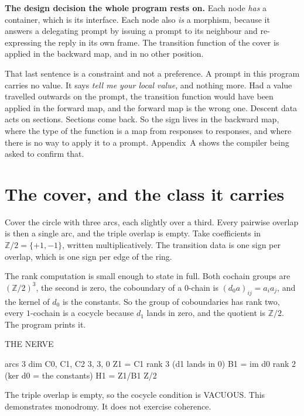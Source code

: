 \documentclass[11pt,a4paper]{article}
\begin{document}
\begin{sectionbox}
\textbf{The design decision the whole program rests on.} Each node \emph{has} a
container, which is its interface. Each node also \emph{is} a morphism, because it
answers a delegating prompt by issuing a prompt to its neighbour and re-expressing
the reply in its own frame. The transition function of the cover is applied in the
backward map, and in no other position.
\end{sectionbox}

That last sentence is a constraint and not a preference. A prompt in this program
carries no value. It says \emph{tell me your local value}, and nothing more. Had a
value travelled outwards on the prompt, the transition function would have been
applied in the forward map, and the forward map is the wrong one. Descent data acts
on sections. Sections come back. So the sign lives in the backward map, where the
type of the function is a map from responses to responses, and where there is no way
to apply it to a prompt. Appendix~A shows the compiler being asked to confirm that.

\section{The cover, and the class it carries}

Cover the circle with three arcs, each slightly over a third. Every pairwise overlap
is then a single arc, and the triple overlap is empty. Take coefficients in
$\mathbb{Z}/2 = \{+1,-1\}$, written multiplicatively. The transition data is one sign
per overlap, which is one sign per edge of the ring.

The rank computation is small enough to state in full. Both cochain groups are
$(\mathbb{Z}/2)^3$, the second is zero, the coboundary of a $0$-chain is
$(d_0 a)_{ij} = a_i a_j$, and the kernel of $d_0$ is the constants. So the group of
coboundaries has rank two, every $1$-cochain is a cocycle because $d_1$ lands in
zero, and the quotient is $\mathbb{Z}/2$. The program prints it.

\begin{term}
  THE NERVE

    arcs                    3
    dim C0, C1, C2          3, 3, 0
    Z1 = C1                 rank 3   (d1 lands in 0)
    B1 = im d0              rank 2   (ker d0 = the constants)
    H1 = Z1/B1              Z/2

    The triple overlap is empty, so the cocycle condition is VACUOUS.
    This demonstrates monodromy. It does not exercise coherence.
\end{term}
\end{document}
